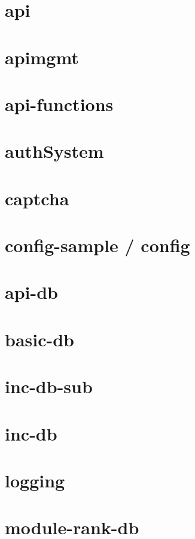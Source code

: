 \section{api}

\newpage
\section{apimgmt}

\newpage
\section{api-functions}

\newpage
\section{authSystem}

\newpage
\section{captcha}

\newpage
\section{config-sample / config}

\newpage
\section{api-db}

\newpage
\section{basic-db}

\newpage
\section{inc-db-sub}

\newpage
\section{inc-db}

\newpage
\section{logging}

\newpage
\section{module-rank-db}

\newpage
